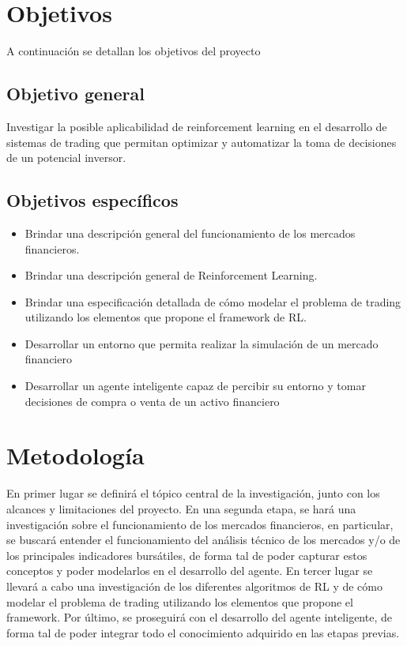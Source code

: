 \section{Objetivos}
A continuación se detallan los objetivos del proyecto

\subsection{Objetivo general}
Investigar la posible aplicabilidad de reinforcement learning en el desarrollo de sistemas de trading que permitan optimizar y automatizar la toma de decisiones de un potencial inversor.

\subsection{Objetivos específicos}

\begin{itemize} %
	
	\item Brindar una descripción general del funcionamiento de los mercados financieros.
	\item Brindar una descripción general de Reinforcement Learning.
	\item Brindar una especificación detallada de cómo modelar el problema de trading utilizando los elementos que propone el framework de RL.
	\item Desarrollar un entorno que permita realizar la simulación de un mercado financiero 
	\item Desarrollar un agente inteligente capaz de percibir su entorno y tomar decisiones de compra o venta de un activo financiero
\end{itemize}

\section{Metodología}
En primer lugar se definirá el tópico central de la investigación, junto con los alcances y limitaciones del proyecto.
En una segunda etapa, se hará una investigación sobre el funcionamiento de los mercados financieros, en particular, se buscará entender el funcionamiento del análisis técnico de los mercados  y/o de los principales indicadores bursátiles, de forma tal de poder capturar estos conceptos y poder modelarlos en el desarrollo del agente.  
En tercer lugar se llevará a cabo una investigación de los diferentes algoritmos de RL y de cómo modelar el problema de trading utilizando los elementos que propone el framework.
Por último, se proseguirá con el desarrollo del agente inteligente, de forma tal de poder integrar todo el conocimiento adquirido en las etapas previas. 

